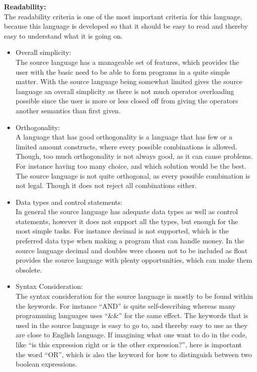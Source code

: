 \textbf{Readability:} \\
The readability criteria is one of the most important criteria for this language, because this language is developed so that it should be easy to read and thereby easy to understand what it is going on. \\
\begin{itemize}
\item Overall simplicity:\\
The source language has a manageable set of features, which provides the user with the basic need to be able to form programs in a quite simple matter. With the source language being somewhat limited gives the source language an overall simplicity as there is not much operator overloading possible since the user is more or less closed off from giving the operators another semantics than first given. 
\item Orthogonality:\\
A language that has good orthogonality is a language that has few or a limited amount constructs, where every possible combinations is allowed. Though, too much orthogonality is not always good, as it can cause problems. For instance having too many choice, and which solution would be the best.\\
The source language is not quite orthogonal, as every possible combination is not legal. Though it does not reject all combinations either.  
\item Data types and control statements:\\
In general the source language has adequate data types as well as control statements, however it does not support all the types, but enough for the most simple tasks. For instance decimal is not supported, which is the preferred data type when making a program that can handle money. In the source language decimal and doubles were chosen not to be included as float provides the source language with plenty opportunities, which can make them obsolete.
\item Syntax Consideration:\\
The syntax consideration for the source language is mostly to be found within the keywords. For instance ``AND'' is quite self-describing whereas many programming languages uses ``\&\&'' for the same effect. The keywords that is used in the source language is easy to go to, and thereby easy to use as they are close to English language. If imagining what one want to do in the code, like ``is this expression right or is the other expression?'', here is important the word ``OR'', which is also the keyword for how to distinguish between two boolean expressions.\\ 
\end{itemize}

